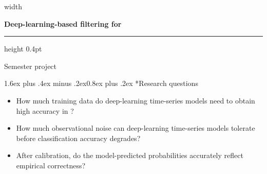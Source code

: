 \documentclass[11pt]{article}
\begin{document}
\begingroup
{}
\pagestyle{plain}
\sffamily
\setlength{\parskip}{0.65em}
\makeatletter
\renewcommand\section{\@startsection{section}{1}{\z@}%
  {1.6ex plus .4ex minus .2ex}{0.8ex plus .2ex}%
  {\normalfont\sffamily\Large\bfseries}}
\renewcommand\subsection{\@startsection{subsection}{2}{\z@}%
  {1.2ex plus .3ex minus .2ex}{0.5ex plus .2ex}%
  {\normalfont\sffamily\large\bfseries}}
\makeatother
\newcommand{\mtProjectHeaderImage}{%
  \pdfximage width\textwidth {tex/assets/eth-siplab-thesis-header.png}%
  \noindent\pdfrefximage\pdflastximage\par
}
\mtProjectHeaderImage
\vspace{1.35em}
{\raggedright\Huge\bfseries Deep-learning-based filtering for \name{}\par}
\vspace{0.45em}
{\color{black!15}\hrule height 0.4pt}
\vspace{1.05em}
{\raggedright\large Semester project\par}
\vspace{1.4em}
\label{docstart:learned_validity_filtering_project}
\section*{Research questions}

\begin{itemize}
    \item How much training data do deep-learning time-series models need to obtain high accuracy in \name{}?
    \item How much observational noise can deep-learning time-series models tolerate before classification accuracy degrades?
    \item After calibration, do the model-predicted probabilities accurately reflect empirical correctness?
\end{itemize}
\end{document}
